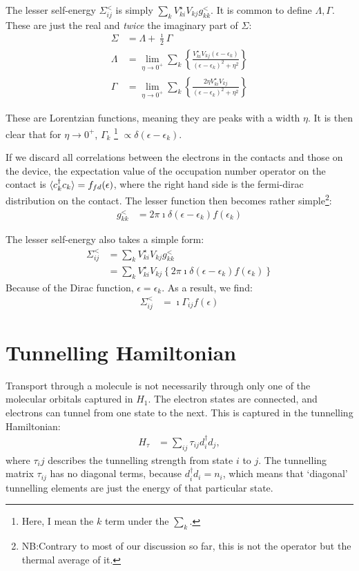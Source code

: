 The lesser self-energy $\Sigma^<_{ij}$ is simply $\sum_{k} V_{ki}^\star V_{kj} g_{kk}^<$. It is common to define  $\Lambda, \Gamma$. These are just the real and \emph{twice} the imaginary part of $\Sigma$:
\begin{align*}
\Sigma &= \Lambda + \frac{\imath}{2} \Gamma \\
\Lambda &=  \lim_{\eta\rightarrow 0^+}\sum_{k} \left\{ \frac{V_{ki}^\star V_{kj} \left(\epsilon-\epsilon_{k}\right)}{  \left(\epsilon-\epsilon_{k}\right)^2 + \eta^2}\right\} \\
\Gamma &= 
\lim_{\eta\rightarrow 0^+}\sum_{k} \left\{ \frac{2 \eta V_{ki}^\star V_{kj}}{  \left(\epsilon-\epsilon_{k}\right)^2 + \eta^2}\right\}
\end{align*}

These are Lorentzian functions, meaning they are peaks with a width $\eta$. It is then clear that for $\eta\rightarrow 0^+$, $\Gamma_{k}$ \footnote{Here, I mean the $k$ term under the $\sum_{k}$.} $\propto \delta(\epsilon-\epsilon_{k})$. 

If we discard all correlations between the electrons in the contacts and those on the device, the expectation value of the occupation number operator on the contact is $\braket{c_{k}^\dagger c_{k}}=f_{fd}(\epsilon)$, where the right hand side is the fermi-dirac distribution on the contact. The lesser function then becomes rather simple\footnote{NB:Contrary to most of our discussion so far, this is not the operator but the thermal average of it.}:
\begin{align*}
g^<_{kk} &= 2\pi\imath \delta(\epsilon-\epsilon_{k}) f(\epsilon_{k})
\end{align*}

The lesser self-energy also takes a simple form:
\begin{align*}
\Sigma^<_{ij} &= \sum_{k} V_{ki}^\star V_{kj} g_{kk}^< \\&= \sum_{k} V_{ki}^\star V_{kj} \left\{2\pi\imath \delta(\epsilon-\epsilon_{k}) f(\epsilon_{k})\right\}
\end{align*}
Because of the Dirac function, $\epsilon=\epsilon_{k}$. As a result, we find:
\begin{align*}
\Sigma^<_{ij} &= \imath \Gamma_{ij} f(\epsilon)
\end{align*}
\section{Tunnelling Hamiltonian}
\label{sec:tunnelling}
Transport through a molecule is not necessarily through only one of the  molecular orbitals captured in $H_1$. The electron states are connected, and electrons can tunnel from one state to the next. This is captured in the tunnelling Hamiltonian:
\begin{align}
H_\tau &= \sum_{ij} \tau_{ij} d_i^\dagger d_j,
\label{eq:tunnelling}
\end{align}
where $\tau_ij$ describes the tunnelling strength from state $i$ to $j$. The tunnelling matrix $\tau_{ij}$ has no diagonal terms, because $d_i^\dagger d_i = n_i$, which means that `diagonal' tunnelling elements are just the energy of that particular state.


